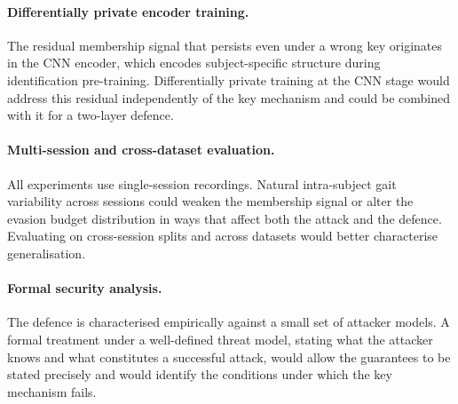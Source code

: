 \paragraph{Differentially private encoder training.}
The residual membership signal that persists even under a wrong key originates in the CNN encoder, which encodes subject-specific structure during identification pre-training. Differentially private training at the CNN stage would address this residual independently of the key mechanism and could be combined with it for a two-layer defence.

\paragraph{Multi-session and cross-dataset evaluation.}
All experiments use single-session recordings. Natural intra-subject gait variability across sessions could weaken the membership signal or alter the evasion budget distribution in ways that affect both the attack and the defence. Evaluating on cross-session splits and across datasets would better characterise generalisation.

\paragraph{Formal security analysis.}
The defence is characterised empirically against a small set of attacker models. A formal treatment under a well-defined threat model, stating what the attacker knows and what constitutes a successful attack, would allow the guarantees to be stated precisely and would identify the conditions under which the key mechanism fails.
